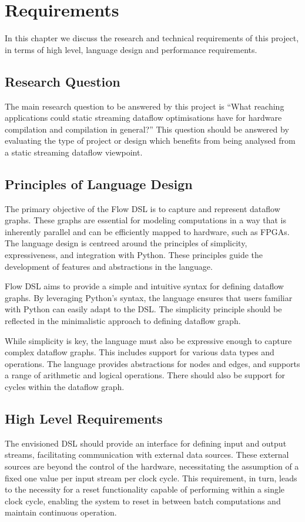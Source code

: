 \chapter{Requirements}\label{chap:requirements}
In this chapter we discuss the research and technical requirements of this project, in terms of high level, language design and performance requirements.

\section{Research Question}
The main research question to be answered by this project is ``What reaching applications could static streaming dataflow optimisations have for hardware compilation and compilation in general?'' This question should be answered by evaluating the type of project or design which benefits from being analysed from a static streaming dataflow viewpoint.

\section{Principles of Language Design}
The primary objective of the Flow DSL is to capture and represent dataflow graphs. These graphs are essential for modeling computations in a way that is inherently parallel and can be efficiently mapped to hardware, such as FPGAs. The language design is centreed around the principles of simplicity, expressiveness, and integration with Python. These principles guide the development of features and abstractions in the language.

Flow DSL aims to provide a simple and intuitive syntax for defining dataflow graphs. By leveraging Python's syntax, the language ensures that users familiar with Python can easily adapt to the DSL. The simplicity principle should be reflected in the minimalistic approach to defining dataflow graph.

While simplicity is key, the language must also be expressive enough to capture complex dataflow graphs. This includes support for various data types and operations. The language provides abstractions for nodes and edges, and supports a range of arithmetic and logical operations. There should also be support for cycles within the dataflow graph.

\section{High Level Requirements}
The envisioned DSL should provide an interface for defining input and output streams, facilitating communication with external data sources. These external sources are beyond the control of the hardware, necessitating the assumption of a fixed one value per input stream per clock cycle. This requirement, in turn, leads to the necessity for a reset functionality capable of performing within a single clock cycle, enabling the system to reset in between batch computations and maintain continuous operation.

